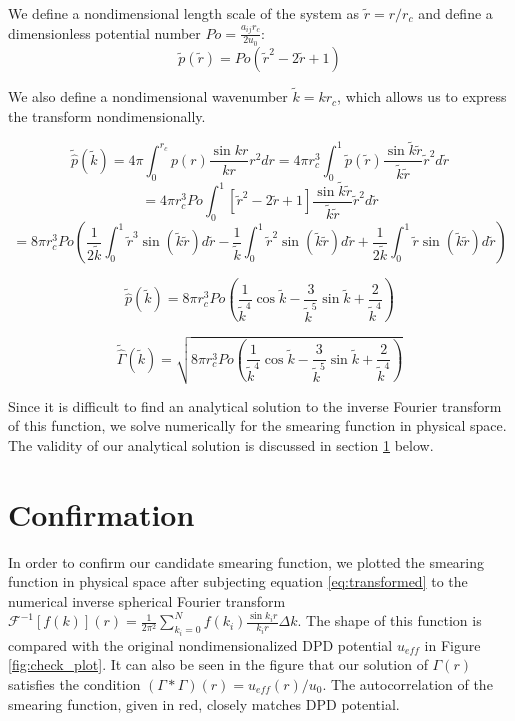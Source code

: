 \documentclass{article}
\begin{document}
We define a nondimensional length scale of the system as \( \tilde r = r / r_c\) and define a dimensionless potential number \(Po = \frac{a_{ij}r_c}{2 u_0}\):
\[\tilde{p}(\tilde{r}) = Po (\tilde{r}^2 - 2\tilde{r} + 1)\]

We also define a nondimensional wavenumber \(\tilde{k} = kr_c\), which allows us to express the transform nondimensionally.

\[\tilde{\hat{p}}(\tilde k) = 4 \pi \int_0^{r_c} p(r) \frac{\sin{kr}}{kr}r^2 dr = 4 \pi r_c^3 \int^1_0 \tilde p (\tilde{r}) \frac{\sin{\tilde{k}\tilde{r}}}{\tilde{k}\tilde{r}}\tilde{r}^2d\tilde{r}\]
\[= 4 \pi r_c^3 Po \int^1_0 \left[ \tilde{r}^2-2\tilde{r}+1 \right] \frac{\sin{\tilde{k}\tilde{r}}}{\tilde{k}\tilde{r}}\tilde{r}^2d\tilde{r}\]
\[= 8 \pi r_c^3Po \left( \frac{1}{2\tilde{k}} \int_0^1 \tilde{r}^3 \sin{(\tilde{k}\tilde{r})} d\tilde{r} - \frac{1}{\tilde{k}}\int_0^1 \tilde{r}^2 \sin{(\tilde{k}\tilde{r})} d\tilde{r} + \frac{1}{2\tilde{k}} \int_0^1 \tilde{r} \sin{(\tilde{k}\tilde{r})} d\tilde{r} \right)\]

\[\tilde{\hat{p}}(\tilde {k})= 8 \pi r_c^3 Po \left( \frac{1}{\tilde{k}^4}\cos{\tilde{k}} - \frac{3}{\tilde{k}^5} \sin{\tilde{k}} + \frac{2}{\tilde{k}^4} \right)\]

\begin{equation}
    \boxed{\tilde{\hat{\Gamma}}(\tilde {k})= \sqrt{8 \pi r_c^3 Po \left( \frac{1}{\tilde{k}^4}\cos{\tilde{k}} - \frac{3}{\tilde{k}^5} \sin{\tilde{k}} + \frac{2}{\tilde{k}^4} \right)}}
    \label{eq:transformed}
 \end{equation}

Since it is difficult to find an analytical solution to the inverse Fourier transform of this function, we solve numerically for the smearing function in physical space. The validity of our analytical solution is discussed in section \ref{sec:confirmation} below.

\section{Confirmation}
\label{sec:confirmation}
In order to confirm our candidate smearing function, we plotted the smearing function in physical space after subjecting equation \ref{eq:transformed} to the numerical inverse spherical Fourier transform \(\mathcal{F}^{-1}[f(k)](r) = \frac{1}{2\pi^2} \sum_{k_i = 0}^N f(k_i) \frac{\sin{k_ir}}{k_ir} \Delta k\). The shape of this function is compared with the original nondimensionalized DPD potential \(u_{eff}\) in Figure \ref{fig:check_plot}. It can also be seen in the figure that our solution of \(\Gamma (r)\) satisfies the condition \((\Gamma *\Gamma)(r) = u_{eff}(r)/u_0\). The autocorrelation of the smearing function, given in red, closely matches DPD potential.
\end{document}
